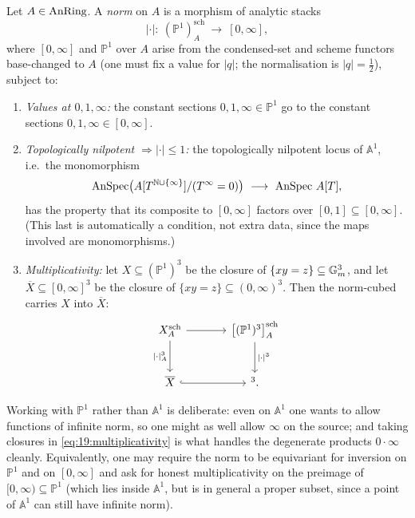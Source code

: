 \begin{definition}
\label{def:19:norm}
Let $A\in\operatorname{AnRing}$. A \emph{norm} on $A$ is a morphism of analytic stacks
\begin{equation*}
|\cdot|\colon\ (\mathbb P^1)^{\mathrm{sch}}_A\ \longrightarrow\ [0,\infty],
\end{equation*}
where $[0,\infty]$ and $\mathbb P^1$ over $A$ arise from the condensed-set and
scheme functors base-changed to $A$ (one must fix a value for $|q|$; the
normalisation is $|q|=\tfrac12$), subject to:
\begin{enumerate}
\item \emph{Values at $0,1,\infty$:} the constant sections $0,1,\infty\in\mathbb
P^1$ go to the constant sections $0,1,\infty\in[0,\infty]$.
\item \emph{Topologically nilpotent $\Rightarrow|\cdot|\le1$:} the topologically
nilpotent locus of $\mathbb A^1$, i.e.\ the monomorphism
\begin{equation*}
\AnSpec\bigl(A[T^{\mathbb N\cup\{\infty\}}]/(T^{\infty}=0)\bigr)\ \longrightarrow\ \AnSpec\,A[T],
\end{equation*}
has the property that its composite to $[0,\infty]$ factors over
$[0,1]\subseteq[0,\infty]$. (This last is automatically a condition, not extra
data, since the maps involved are monomorphisms.)
\item \emph{Multiplicativity:} let $X\subseteq(\mathbb P^1)^3$ be the closure of
$\{xy=z\}\subseteq\mathbb{G}_{m}^3$, and let $\overline X\subseteq[0,\infty]^3$ be the closure
of $\{xy=z\}\subseteq(0,\infty)^3$. Then the norm-cubed carries $X$ into
$\overline X$:
\begin{equation}
\label{eq:19:multiplicativity}
\begin{tikzcd}[row sep=large, column sep=large]
X^{\mathrm{sch}}_A\arrow[r]\arrow[d, "|\cdot|^3_A"'] & \bigl[(\mathbb P^1)^3\bigr]^{\mathrm{sch}}_A\arrow[d, "|\cdot|^3"] \\
\overline X\arrow[r, hook] & [0,\infty]^3 .
\end{tikzcd}
\end{equation}
\end{enumerate}
Working with $\mathbb P^1$ rather than $\mathbb A^1$ is deliberate: even on
$\mathbb A^1$ one wants to allow functions of infinite norm, so one might as well
allow $\infty$ on the source; and taking closures in
\eqref{eq:19:multiplicativity} is what handles the degenerate products $0\cdot\infty$
cleanly. Equivalently, one may require the norm to be equivariant for inversion on
$\mathbb P^1$ and on $[0,\infty]$ and ask for honest multiplicativity on the
preimage of $[0,\infty)\subseteq\mathbb P^1$ (which lies inside $\mathbb A^1$, but
is in general a proper subset, since a point of $\mathbb A^1$ can still have
infinite norm).
\end{definition}

